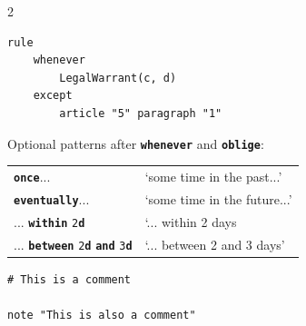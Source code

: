 \documentclass[a4paper,9pt]{extarticle}
\newcommand{\kw}[1]{{\color{magenta}\texttt{\bfseries\upshape #1}}}
\newcommand{\bluekw}[1]{{\color{blue}\texttt{\bfseries\upshape #1}}}
\begin{document}
\begin{multicols}{2}
\begin{tcolorbox}[title={\bfseries 6 \quad Rules}, colframe=blue!75!black, left=1pt, right=1pt, top=0pt, bottom=0pt]
\begin{tcolorbox}[title=6.3 Exception rules, left=1pt, right=1pt]
\begin{lstlisting}
rule
    whenever
        LegalWarrant(c, d)
    except
        article "5" paragraph "1"
\end{lstlisting}
        \vspace{-1em}
      \end{tcolorbox}
      
      \begin{tcolorbox}[title=6.4 Patterns, left=1pt, right=1pt]
        Optional patterns after \kw{whenever} and \kw{oblige}:
        
        \begin{tabular}{ll}
          \kw{once}... & `some time in the past...' \\
          \kw{eventually}... & `some time in the future...'\\
          ... \kw{within} \texttt{2}\bluekw{d}  & `... within 2 days \\
          ... \kw{between} \texttt{2}\bluekw{d} \kw{and} \texttt{3}\bluekw{d}  & `... between 2 and 3 days'
        \end{tabular}
      \end{tcolorbox}
    \end{tcolorbox}

    \begin{tcolorbox}[title={\bfseries 7 \quad Comments}, colframe=blue!75!black, left=1pt, right=1pt, top=0pt, bottom=0pt]
\begin{lstlisting}
# This is a comment

note "This is also a comment"
\end{lstlisting}
    \end{tcolorbox}
    \end{multicols}
\end{document}
